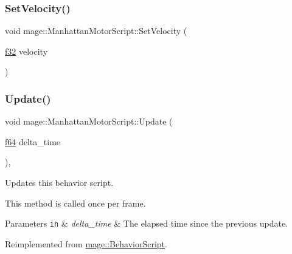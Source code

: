 \hypertarget{classmage_1_1_manhattan_motor_script_a377aef19004473a9702f5275f8a26bb5}{}\label{classmage_1_1_manhattan_motor_script_a377aef19004473a9702f5275f8a26bb5} 
\subsubsection{\texorpdfstring{Set\+Velocity()}{SetVelocity()}}
{\footnotesize\ttfamily void mage\+::\+Manhattan\+Motor\+Script\+::\+Set\+Velocity (\begin{DoxyParamCaption}\item[{\hyperlink{namespacemage_a6a44ad388483959dc4dff9f2aef91431}{f32}}]{velocity }\end{DoxyParamCaption})\hspace{0.3cm}{\ttfamily [noexcept]}}

\hypertarget{classmage_1_1_manhattan_motor_script_a7d342e8c4a83aaebe3c8eaaacb65d167}{}\label{classmage_1_1_manhattan_motor_script_a7d342e8c4a83aaebe3c8eaaacb65d167} 
\subsubsection{\texorpdfstring{Update()}{Update()}}
{\footnotesize\ttfamily void mage\+::\+Manhattan\+Motor\+Script\+::\+Update (\begin{DoxyParamCaption}\item[{\hyperlink{namespacemage_ab935747c6941320bd6214b5a5f265b09}{f64}}]{delta\+\_\+time }\end{DoxyParamCaption})\hspace{0.3cm}{\ttfamily [override]}, {\ttfamily [virtual]}}

Updates this behavior script.

This method is called once per frame.


\begin{DoxyParams}[1]{Parameters}
\mbox{\tt in}  & {\em delta\+\_\+time} & The elapsed time since the previous update. \\
\hline
\end{DoxyParams}


Reimplemented from \hyperlink{classmage_1_1_behavior_script_ae42e869ca8d4e4b3ad2af589b0ca9924}{mage\+::\+Behavior\+Script}.



